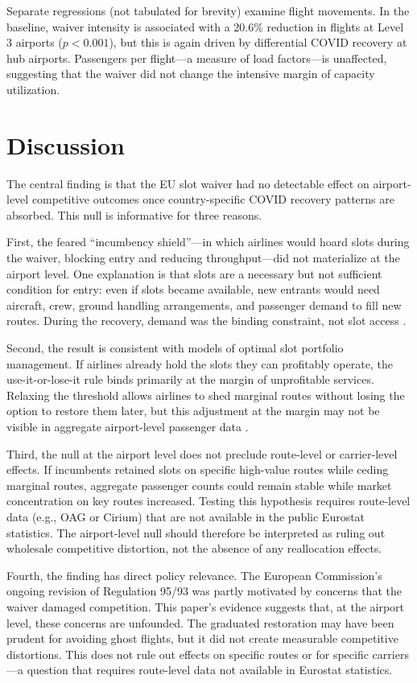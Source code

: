 \documentclass[12pt]{article}
\begin{document}
Separate regressions (not tabulated for brevity) examine flight movements. In the baseline, waiver intensity is associated with a 20.6\% reduction in flights at Level 3 airports ($p < 0.001$), but this is again driven by differential COVID recovery at hub airports. Passengers per flight---a measure of load factors---is unaffected, suggesting that the waiver did not change the intensive margin of capacity utilization.

\section{Discussion}

The central finding is that the EU slot waiver had no detectable effect on airport-level competitive outcomes once country-specific COVID recovery patterns are absorbed. This null is informative for three reasons.

First, the feared ``incumbency shield''---in which airlines would hoard slots during the waiver, blocking entry and reducing throughput---did not materialize at the airport level. One explanation is that slots are a necessary but not sufficient condition for entry: even if slots became available, new entrants would need aircraft, crew, ground handling arrangements, and passenger demand to fill new routes. During the recovery, demand was the binding constraint, not slot access \citep{brueckner2009}.

Second, the result is consistent with models of optimal slot portfolio management. If airlines already hold the slots they can profitably operate, the use-it-or-lose-it rule binds primarily at the margin of unprofitable services. Relaxing the threshold allows airlines to shed marginal routes without losing the option to restore them later, but this adjustment at the margin may not be visible in aggregate airport-level passenger data \citep{czerny2008, verhoef2010}.

Third, the null at the airport level does not preclude route-level or carrier-level effects. If incumbents retained slots on specific high-value routes while ceding marginal routes, aggregate passenger counts could remain stable while market concentration on key routes increased. Testing this hypothesis requires route-level data (e.g., OAG or Cirium) that are not available in the public Eurostat statistics. The airport-level null should therefore be interpreted as ruling out wholesale competitive distortion, not the absence of any reallocation effects.

Fourth, the finding has direct policy relevance. The European Commission's ongoing revision of Regulation 95/93 was partly motivated by concerns that the waiver damaged competition. This paper's evidence suggests that, at the airport level, these concerns are unfounded. The graduated restoration may have been prudent for avoiding ghost flights, but it did not create measurable competitive distortions. This does not rule out effects on specific routes or for specific carriers---a question that requires route-level data not available in Eurostat statistics.
\end{document}
